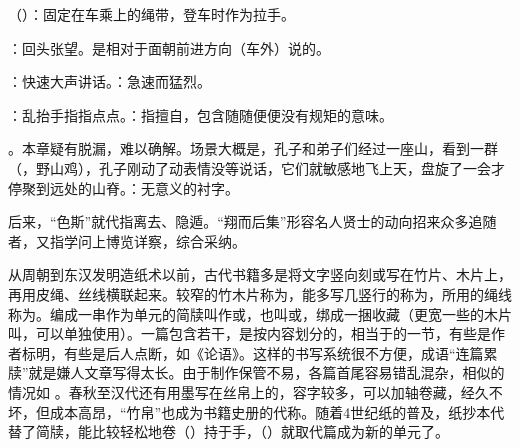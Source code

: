 {
\item {}（）：固定在车乘上的绳带，登车时作为拉手。
\item {}：回头张望。是相对于面朝前进方向（车外）说的。
\item {}：快速大声讲话。：急速而猛烈。
\item {}：乱抬手指指点点。：指擅自，包含随随便便没有规矩的意味。
}
{}


{
\item {}。本章疑有脱漏，难以确解。场景大概是，孔子和弟子们经过一座山，看到一群（，野山鸡），孔子刚动了动表情没等说话，它们就敏感地飞上天，盘旋了一会才停聚到远处的山脊。：无意义的衬字。


后来，“色斯”就代指离去、隐遁。“翔而后集”形容名人贤士的动向招来众多追随者，又指学问上博览详察，综合采纳。

从周朝到东汉发明造纸术以前，古代书籍多是将文字竖向刻或写在竹片、木片上，再用皮绳、丝线横联起来。较窄的竹木片称为，能多写几竖行的称为，所用的绳线称为。编成一串作为单元的简牍叫作或，也叫或，绑成一捆收藏（更宽一些的木片叫，可以单独使用）。一篇包含若干，是按内容划分的，相当于的一节，有些是作者标明，有些是后人点断，如《论语》。这样的书写系统很不方便，成语“连篇累牍”就是嫌人文章写得太长。由于制作保管不易，各篇首尾容易错乱混杂，相似的情况如   。春秋至汉代还有用墨写在丝帛上的，容字较多，可以加轴卷藏，经久不坏，但成本高昂，“竹帛”也成为书籍史册的代称。随着4世纪纸的普及，纸抄本代替了简牍，能比较轻松地卷（）持于手，（）就取代篇成为新的单元了。

}
